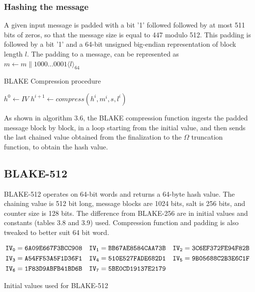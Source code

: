   \subsubsection{Hashing the message}

  A given input message is padded with a bit '1' followed followed by at most 511 bits of zeros, so that the message 
  size is equal to 447 modulo 512. This padding is followed by a bit '1' and a 64-bit unsigned big-endian representation
  of block length $l$. The padding to a message, can be represented as $m \gets m \parallel 1000 \dots 0001\langle l \rangle_{64}$

  \begin{algorithm}
  \caption{BLAKE Compression procedure \cite{00002}}
  \begin{algorithmic}[1]
    \State $ h^{0} \gets IV $
      \State $h^{i+1} \gets compress(h^{i}, m^{i}, s, l^{i})$
    \EndFor
    \State{}
  \end{algorithmic}
  \end{algorithm}

  As shown in algorithm 3.6, the BLAKE compression function ingests the padded message block by block, in a loop 
  starting from the initial value, and then sends the last chained value obtained from the finalization to the 
  $\Omega$ truncation function, to obtain the hash value.

\subsection{BLAKE-512}

BLAKE-512 operates on 64-bit words and returns a 64-byte hash value. The chaining value is 512 bit long, message blocks are
1024 bits, salt is 256 bits, and counter size is 128 bits. The difference from BLAKE-256 are in initial values and constants
(tables 3.8 and 3.9) used. Compression function and padding is also tweaked to better suit 64 bit word.

  \begin{table}[H]
    \begin{align*}
      {\tt IV_{0}} &= {\tt 6A09E667F3BCC908} & {\tt IV_{1}} &= {\tt BB67AE8584CAA73B} & {\tt IV_{2}} &= {\tt 3C6EF372FE94F82B} \\
      {\tt IV_{3}} &= {\tt A54FF53A5F1D36F1} & {\tt IV_{4}} &= {\tt 510E527FADE682D1} & {\tt IV_{5}} &= {\tt 9B05688C2B3E6C1F} \\
      {\tt IV_{6}} &= {\tt 1F83D9ABFB41BD6B} & {\tt IV_{7}} &= {\tt 5BE0CD19137E2179} &                                        \\      
    \end{align*}
    \caption{Initial values used for BLAKE-512 \cite{00002}}
  \end{table}
  
